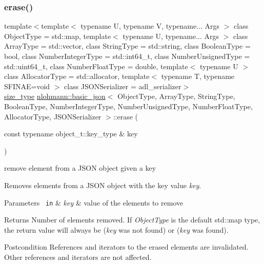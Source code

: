 \subsubsection{\texorpdfstring{erase()}{erase()}\hspace{0.1cm}{\footnotesize\ttfamily [3/4]}}
{\footnotesize\ttfamily template$<$template$<$ typename U, typename V, typename... Args $>$ class Object\+Type = std\+::map, template$<$ typename U, typename... Args $>$ class Array\+Type = std\+::vector, class String\+Type  = std\+::string, class Boolean\+Type  = bool, class Number\+Integer\+Type  = std\+::int64\+\_\+t, class Number\+Unsigned\+Type  = std\+::uint64\+\_\+t, class Number\+Float\+Type  = double, template$<$ typename U $>$ class Allocator\+Type = std\+::allocator, template$<$ typename T, typename S\+F\+I\+N\+A\+E=void $>$ class J\+S\+O\+N\+Serializer = adl\+\_\+serializer$>$ \\
\mbox{\hyperlink{classnlohmann_1_1basic__json_a39f2cd0b58106097e0e67bf185cc519b}{size\+\_\+type}} \mbox{\hyperlink{classnlohmann_1_1basic__json}{nlohmann\+::basic\+\_\+json}}$<$ Object\+Type, Array\+Type, String\+Type, Boolean\+Type, Number\+Integer\+Type, Number\+Unsigned\+Type, Number\+Float\+Type, Allocator\+Type, J\+S\+O\+N\+Serializer $>$\+::erase (\begin{DoxyParamCaption}\item[{const typename object\+\_\+t\+::key\+\_\+type \&}]{key }\end{DoxyParamCaption})\hspace{0.3cm}{\ttfamily [inline]}}



remove element from a J\+S\+ON object given a key 

Removes elements from a J\+S\+ON object with the key value {\itshape key}.


\begin{DoxyParams}[1]{Parameters}
\mbox{\texttt{ in}}  & {\em key} & value of the elements to remove\\
\hline
\end{DoxyParams}
\begin{DoxyReturn}{Returns}
Number of elements removed. If {\itshape Object\+Type} is the default {\ttfamily std\+::map} type, the return value will always be {} ({\itshape key} was not found) or {} ({\itshape key} was found).
\end{DoxyReturn}
\begin{DoxyPostcond}{Postcondition}
References and iterators to the erased elements are invalidated. Other references and iterators are not affected.
\end{DoxyPostcond}

